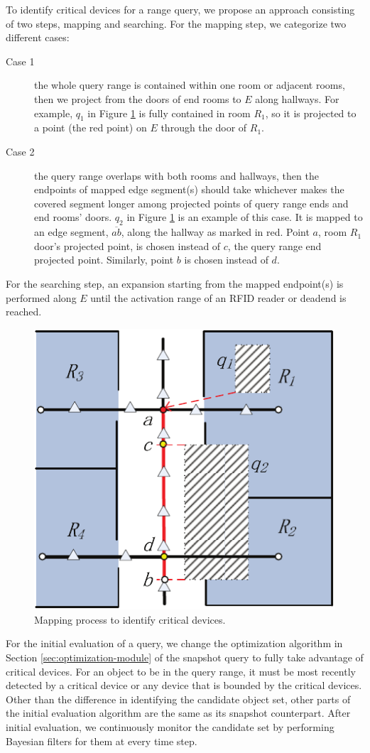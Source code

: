 \documentclass[12pt]{report}
\begin{document}
To identify critical devices for a range query, we propose an
approach consisting of two steps, mapping and searching.  For the
mapping step, we categorize two different cases:

\begin{description}
\item[{Case 1}] the whole query range is contained within one room or
adjacent rooms, then we project from the doors of end rooms
to \(E\) along hallways.  For example, \(q_1\) in Figure
\ref{fig:critical-device} is fully contained in room \(R_1\), so it
is projected to a point (the red point) on \(E\) through the
door of \(R_1\).
\item[{Case 2}] the query range overlaps with both rooms and hallways,
then the endpoints of mapped edge segment(s) should take
whichever makes the covered segment longer among projected
points of query range ends and end rooms' doors.  \(q_2\) in
Figure \ref{fig:critical-device} is an example of this case.  It is
mapped to an edge segment, \(\overline{ab}\), along the
hallway as marked in red.  Point \(a\), room \(R_1\) door's
projected point, is chosen instead of \(c\), the query range
end projected point.  Similarly, point \(b\) is chosen
instead of \(d\).
\end{description}

For the searching step, an expansion starting from the mapped
endpoint(s) is performed along \(E\) until the activation range of
an RFID reader or deadend is reached.

\begin{figure}[htbp]
\centering
\includegraphics[width=.5\textwidth]{img/critical-device.pdf}
\caption{\label{fig:critical-device}
Mapping process to identify critical devices.}
\end{figure}

For the initial evaluation of a query, we change the optimization
algorithm in Section \ref{sec:optimization-module} of the snapshot
query to fully take advantage of critical devices.  For an object
to be in the query range, it must be most recently detected by a
critical device or any device that is bounded by the critical
devices.  Other than the difference in identifying the candidate
object set, other parts of the initial evaluation algorithm are
the same as its snapshot counterpart.  After initial evaluation,
we continuously monitor the candidate set by performing Bayesian
filters for them at every time step.
\end{document}
